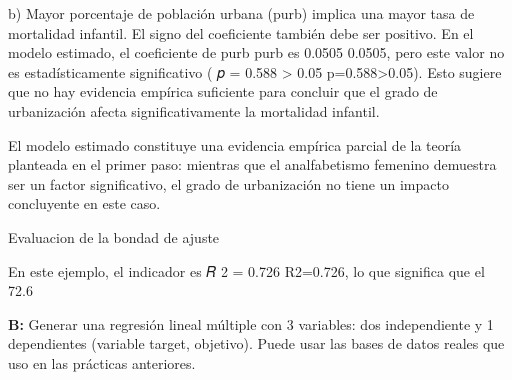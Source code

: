 b) Mayor porcentaje de población urbana (purb) implica una mayor tasa de mortalidad infantil. El signo del coeficiente también debe ser positivo. En el modelo estimado, el coeficiente de purb purb es  0.0505 0.0505, pero este valor no es estadísticamente significativo ( 𝑝 = 0.588 > 0.05 p=0.588>0.05). Esto sugiere que no hay evidencia empírica suficiente para concluir que el grado de urbanización afecta significativamente la mortalidad infantil.

El modelo estimado constituye una evidencia empírica parcial de la teoría planteada en el primer paso: mientras que el analfabetismo femenino demuestra ser un factor significativo, el grado de urbanización no tiene un impacto concluyente en este caso.



Evaluacion de la bondad de ajuste

En este ejemplo, el indicador es 𝑅 2 = 0.726 R2=0.726, lo que significa que el 72.6%

\textbf{B:} Generar una regresión lineal múltiple con 3 variables: dos  independiente y 1 dependientes (variable target, objetivo). Puede usar las bases de datos reales que uso en las prácticas anteriores.